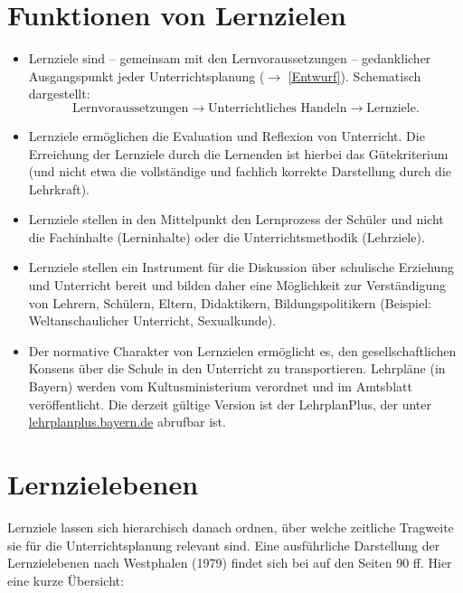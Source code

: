 \section{Funktionen von Lernzielen}
\begin{itemize}
	\item Lernziele sind -- gemeinsam mit den Lernvoraussetzungen -- gedanklicher Ausgangspunkt jeder Unterrichtsplanung ($\to$ \cref{Entwurf}). Schematisch dargestellt: \begin{equation*}
		\text{Lernvoraussetzungen} \longrightarrow \text{Unterrichtliches Handeln} \longrightarrow \text{Lernziele.}
	\end{equation*}
	\item Lernziele ermöglichen die Evaluation und Reflexion von Unterricht. Die Erreichung der Lernziele durch die Lernenden ist hierbei das Gütekriterium (und nicht etwa die vollständige und fachlich korrekte Darstellung durch die Lehrkraft).
	\item Lernziele stellen in den Mittelpunkt den Lernprozess der
	Sch\"{u}ler und nicht die Fachinhalte (Lerninhalte) oder
	die Unterrichtsmethodik (Lehrziele).
	\item
	Lernziele stellen ein Instrument f\"{u}r die Diskussion \"{u}ber
	schulische Erziehung und Unterricht bereit und bilden
	daher eine M\"{o}glichkeit zur Verst\"{a}ndigung von Lehrern,
	Sch\"{u}lern, Eltern, Didaktikern, Bildungspolitikern
	(Beispiel: Weltanschaulicher Unterricht, Sexualkunde).
	\item
	Der normative Charakter von Lernzielen erm\"{o}glicht es, den
	gesellschaftlichen Konsens \"{u}ber die Schule in den Unterricht zu
	transportieren. Lehrpl\"{a}ne (in Bayern) werden vom Kultusministerium verordnet
	und im Amtsblatt ver\"{o}ffentlicht. Die derzeit gültige Version ist der LehrplanPlus, der unter \url{lehrplanplus.bayern.de} abrufbar ist.
\end{itemize}

\section{Lernzielebenen}

Lernziele lassen sich hierarchisch danach ordnen, über welche zeitliche Tragweite sie für die Unterrichtsplanung relevant sind. Eine ausführliche Darstellung der Lernzielebenen nach Westphalen (1979) findet sich bei \textcite{KircherGirwidzHaussler1} auf den Seiten 90 ff. Hier eine kurze Übersicht:

